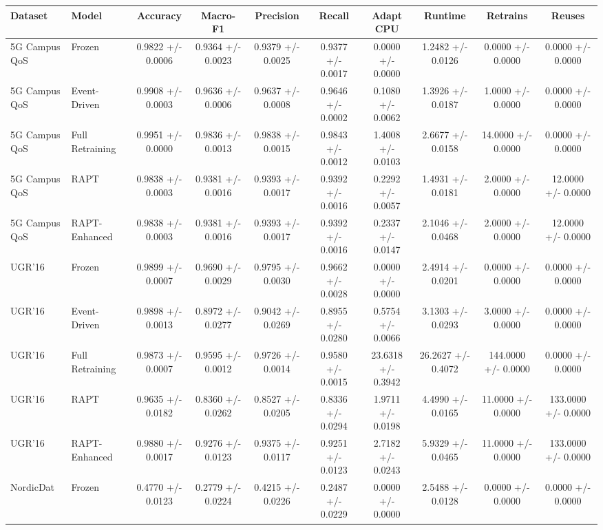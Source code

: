 \begin{tabular}{llcccccccc}
\toprule
Dataset & Model & Accuracy & Macro-F1 & Precision & Recall & Adapt CPU & Runtime & Retrains & Reuses \\
\midrule
5G Campus QoS & Frozen & 0.9822 +/- 0.0006 & 0.9364 +/- 0.0023 & 0.9379 +/- 0.0025 & 0.9377 +/- 0.0017 & 0.0000 +/- 0.0000 & 1.2482 +/- 0.0126 & 0.0000 +/- 0.0000 & 0.0000 +/- 0.0000 \\
5G Campus QoS & Event-Driven & 0.9908 +/- 0.0003 & 0.9636 +/- 0.0006 & 0.9637 +/- 0.0008 & 0.9646 +/- 0.0002 & 0.1080 +/- 0.0062 & 1.3926 +/- 0.0187 & 1.0000 +/- 0.0000 & 0.0000 +/- 0.0000 \\
5G Campus QoS & Full Retraining & 0.9951 +/- 0.0000 & 0.9836 +/- 0.0013 & 0.9838 +/- 0.0015 & 0.9843 +/- 0.0012 & 1.4008 +/- 0.0103 & 2.6677 +/- 0.0158 & 14.0000 +/- 0.0000 & 0.0000 +/- 0.0000 \\
5G Campus QoS & RAPT & 0.9838 +/- 0.0003 & 0.9381 +/- 0.0016 & 0.9393 +/- 0.0017 & 0.9392 +/- 0.0016 & 0.2292 +/- 0.0057 & 1.4931 +/- 0.0181 & 2.0000 +/- 0.0000 & 12.0000 +/- 0.0000 \\
5G Campus QoS & RAPT-Enhanced & 0.9838 +/- 0.0003 & 0.9381 +/- 0.0016 & 0.9393 +/- 0.0017 & 0.9392 +/- 0.0016 & 0.2337 +/- 0.0147 & 2.1046 +/- 0.0468 & 2.0000 +/- 0.0000 & 12.0000 +/- 0.0000 \\
UGR'16 & Frozen & 0.9899 +/- 0.0007 & 0.9690 +/- 0.0029 & 0.9795 +/- 0.0030 & 0.9662 +/- 0.0028 & 0.0000 +/- 0.0000 & 2.4914 +/- 0.0201 & 0.0000 +/- 0.0000 & 0.0000 +/- 0.0000 \\
UGR'16 & Event-Driven & 0.9898 +/- 0.0013 & 0.8972 +/- 0.0277 & 0.9042 +/- 0.0269 & 0.8955 +/- 0.0280 & 0.5754 +/- 0.0066 & 3.1303 +/- 0.0293 & 3.0000 +/- 0.0000 & 0.0000 +/- 0.0000 \\
UGR'16 & Full Retraining & 0.9873 +/- 0.0007 & 0.9595 +/- 0.0012 & 0.9726 +/- 0.0014 & 0.9580 +/- 0.0015 & 23.6318 +/- 0.3942 & 26.2627 +/- 0.4072 & 144.0000 +/- 0.0000 & 0.0000 +/- 0.0000 \\
UGR'16 & RAPT & 0.9635 +/- 0.0182 & 0.8360 +/- 0.0262 & 0.8527 +/- 0.0205 & 0.8336 +/- 0.0294 & 1.9711 +/- 0.0198 & 4.4990 +/- 0.0165 & 11.0000 +/- 0.0000 & 133.0000 +/- 0.0000 \\
UGR'16 & RAPT-Enhanced & 0.9880 +/- 0.0017 & 0.9276 +/- 0.0123 & 0.9375 +/- 0.0117 & 0.9251 +/- 0.0123 & 2.7182 +/- 0.0243 & 5.9329 +/- 0.0465 & 11.0000 +/- 0.0000 & 133.0000 +/- 0.0000 \\
NordicDat & Frozen & 0.4770 +/- 0.0123 & 0.2779 +/- 0.0224 & 0.4215 +/- 0.0226 & 0.2487 +/- 0.0229 & 0.0000 +/- 0.0000 & 2.5488 +/- 0.0128 & 0.0000 +/- 0.0000 & 0.0000 +/- 0.0000 \\

\end{tabular}

